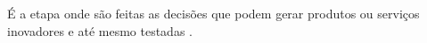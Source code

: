 É a etapa onde são feitas as decisões que podem gerar produtos ou serviços inovadores e até mesmo testadas \cite{verganti2020innovation}.